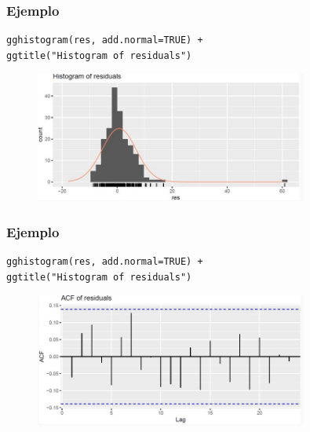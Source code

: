\documentclass[10pt]{beamer}
\begin{document}




\begin{frame}[fragile]
\frametitle{Ejemplo}


\begin{lstlisting}
gghistogram(res, add.normal=TRUE) +
ggtitle("Histogram of residuals")
\end{lstlisting}

\pause


\begin{figure}
\begin{center}
    \includegraphics[width=0.8\textwidth]{Imagen14.JPG}
\end{center}
\end{figure}


\end{frame}






\begin{frame}[fragile]
\frametitle{Ejemplo}


\begin{lstlisting}
gghistogram(res, add.normal=TRUE) +
ggtitle("Histogram of residuals")
\end{lstlisting}

\pause


\begin{figure}
\begin{center}
    \includegraphics[width=0.8\textwidth]{Imagen15.JPG}
\end{center}
\end{figure}


\end{frame}
\end{document}
